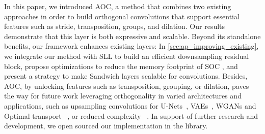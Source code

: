%
In this paper, we introduced AOC, a method that combines two existing approaches in order to build orthogonal convolutions that support essential features such as stride, transposition, groups, and dilation. Our results demonstrate that this layer is both expressive and scalable.
%
Beyond its standalone benefits, our framework enhances existing layers: In \cref{sec:ap_improving_existing}, we integrate our method with SLL \cite{araujo_unified_2023} to build an efficient downsampling residual block, propose optimizations to reduce the memory footprint of SOC \cite{singla_fantastic_2021}, and present a strategy to make Sandwich layers \cite{wang_direct_2023} scalable for convolutions.
%
Besides, AOC, by unlocking features such as transposition, grouping, or dilation, paves the way for future work leveraging orthogonality in varied architectures and applications, such as upsampling convolutions for U-Nets~\cite{ronneberger2015u}, VAEs~\cite{kingma2013auto},  WGANs and Optimal transport ~\cite{arjovsky2017wasserstein,bethune2024deep}, or reduced complexity ~\cite{li2018csrnet,xie2017aggregated}. 
In support of further research and development, we open sourced our implementation in the \fulllibname{} library.


%
